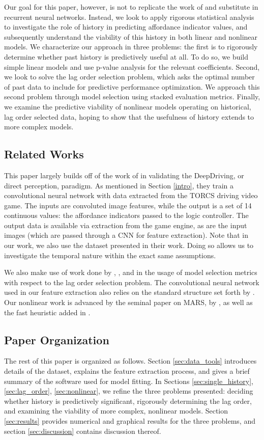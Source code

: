 \documentclass[master]{subfiles}
\begin{document}
Our goal for this paper, however, is not to replicate the work of \cite{deepdriving} and substitute in recurrent neural networks.  Instead, we look to apply rigorous statistical analysis to investigate the role of history in predicting affordance indicator values, and subsequently understand the viability of this history in both linear and nonlinear models.  We characterize our approach in three problems: the first is to rigorously determine whether past history is predictively useful at all.  To do so, we build simple linear models and use p-value analysis for the relevant coefficients.  Second, we look to solve the lag order selection problem, which asks the optimal number of past data to include for predictive performance optimization.  We approach this second problem through model selection using stacked evaluation metrics.  Finally, we examine the predictive viability of nonlinear models operating on historical, lag order selected data, hoping to show that the usefulness of history extends to more complex models.\par
\subsection{Related Works}
This paper largely builds off of the work of \cite{deepdriving} in validating the DeepDriving, or direct perception, paradigm.  As mentioned in Section \ref{intro}, they train a convolutional neural network with data extracted from the TORCS driving video game.  The inputs are convoluted image features, while the output is a set of 14 continuous values: the affordance indicators passed to the logic controller.  The output data is available via extraction from the game engine, as are the input images (which are passed through a CNN for feature extraction).  Note that in our work, we also use the dataset presented in their work.  Doing so allows us to investigate the temporal nature within the exact same assumptions.\par
We also make use of work done by \cite{aic_bic1}, \cite{aic_bic2}, and \cite{liew} in the usage of model selection metrics with respect to the lag order selection problem.  The convolutional neural network used in our feature extraction also relies on the standard structure set forth by \cite{lenet}.  Our nonlinear work is advanced by the seminal paper on MARS, by \cite{mars}, as well as the fast heuristic added in \cite{fastmars}.
\subsection{Paper Organization}
The rest of this paper is organized as follows.  Section \ref{sec:data_tools} introduces details of the dataset, explains the feature extraction process, and gives a brief summary of the software used for model fitting.  In Sections \ref{sec:single_history}, \ref{sec:lag_order}, \ref{sec:nonlinear}, we refine the three problems presented: deciding whether history is predictively significant, rigorously determining the lag order, and examining the viability of more complex, nonlinear models.  Section \ref{sec:results} provides numerical and graphical results for the three problems, and section \ref{sec:discussion} contains discussion thereof.
\newpage
\end{document}

